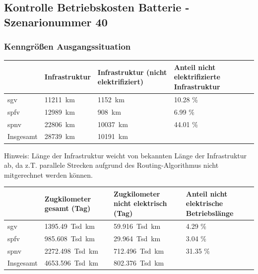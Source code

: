 \subsection{Kontrolle Betriebskosten Batterie - Szenarionummer 40}\label{chap_kenngrößen_s_40}

\subsubsection{Kenngrößen Ausgangssituation}
\begin{center}
	\begin{tabularx}{\textwidth}{l | X | X | X} & Infrastruktur & Infrastruktur (nicht elektrifiziert) & Anteil nicht elektrifizierte Infrastruktur \\
	\hline
	\acrshort{sgv} & \SI{11211}{\km} & \SI{1152}{\km} & \num{10.28} \% \\
	\acrshort{spfv} & \SI{12989}{\km} & \SI{908}{\km} & \num{6.99} \% \\
	\acrshort{spnv} & \SI{22806}{\km} & \SI{10037}{\km} & \num{44.01} \% \\
	\hline
	Insgesamt & \SI{28739}{\km} & \SI{10191}{\km} & \\
	\end{tabularx}
\end{center}
\hspace{2em}
Hinweis: Länge der Infrastruktur weicht von bekannten Länge der Infrastruktur ab, da z.T. parallele Strecken aufgrund des Routing-Algorithmus nicht mitgerechnet werden können.

\begin{center}
	\begin{tabularx}{\textwidth}{l | X | X | X} & Zugkilometer gesamt (Tag) & Zugkilometer nicht elektrisch (Tag) & Anteil nicht elektrische Betriebslänge \\
	\hline
	\acrshort{sgv} & \SI{1395.49}{Tsd. \km} & \SI{59.916}{Tsd. \km} & \num{4.29}  \% \\
	\acrshort{spfv} & \SI{985.608}{Tsd. \km} & \SI{29.964}{Tsd. \km} & \num{3.04} \% \\
	\acrshort{spnv} & \SI{2272.498}{Tsd. \km} & \SI{712.496}{Tsd. \km} & \num{31.35} \% \\
	\hline
	Insgesamt & \SI{4653.596}{Tsd. \km} & \SI{802.376}{Tsd. \km} & \\
	\end{tabularx}
\end{center}


